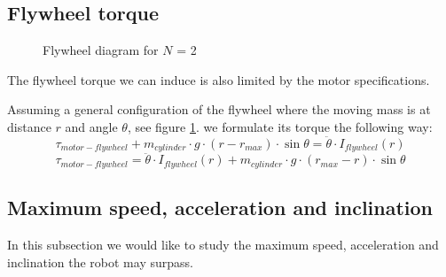 \subsection{Flywheel torque}
\begin{figure}
	\centering
            \caption{Flywheel diagram for $N$ = 2}
	\label{fig:Flywheel force diagram}
\end{figure}

The flywheel torque we can induce is also limited by the motor specifications. 

Assuming a general configuration of the flywheel where the moving mass is at distance $r$ and angle $\theta$, see figure \ref{fig:Flywheel force diagram}. we formulate its torque the following way:
\[
    \tau_{motor-flywheel} + m_{cylinder} \cdot g \cdot (r - r_{max}) \cdot \sin{\theta} = \ddot{\theta}\cdot I_{flywheel}(r)  
\]
\begin{equation}\label{flywheel equation}    
    \tau_{motor-flywheel} = \ddot{\theta}\cdot I_{flywheel}(r) + m_{cylinder} \cdot g \cdot (r_{max} - r) \cdot \sin{\theta}  
\end{equation}

\subsection{Maximum speed, acceleration and inclination}
In this subsection we would like to study the maximum speed, acceleration and inclination the robot may surpass.

